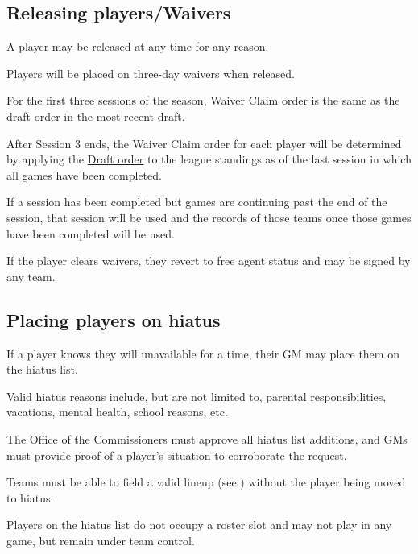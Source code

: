 \subsection{Releasing players/Waivers}
\begin{deepEnumerate}
	\item A player may be released at any time for any reason.
	\item Players will be placed on three-day waivers when released.
	\begin{deepEnumerate}
		\item For the first three sessions of the season, Waiver Claim order is the same as the draft order in the most recent draft.
		\item After Session 3 ends, the Waiver Claim order for each player will be determined by applying the \hyperref[sec:Draft order]{Draft order}
		to the league standings	as of the last session in which all games have been completed.
		\begin{deepEnumerate}
			\item If a session has been completed but games are continuing past the end of the session, 
			that session will be used and the records of those teams once those games have been completed will be used.
		\end{deepEnumerate}
		\item If the player clears waivers, they revert to free agent status and may be signed by any team.
	\end{deepEnumerate}
\end{deepEnumerate}

\subsection{Placing players on hiatus}
\begin{deepEnumerate}
	\item If a player knows they will unavailable for a time, their GM may place them on the hiatus list.
	\begin{deepEnumerate}
		\item Valid hiatus reasons include, but are not limited to,	parental responsibilities, vacations, mental health, school reasons, etc.
		\item The Office of the Commissioners must approve all hiatus list additions,	and GMs must provide proof of a player's situation to corroborate the request.
		\item Teams must be able to field a valid lineup (see ) without the player being moved to hiatus.
	\end{deepEnumerate}
	\item Players on the hiatus list do not occupy a roster slot and may not play in any game, but remain under team control.
\end{deepEnumerate}

